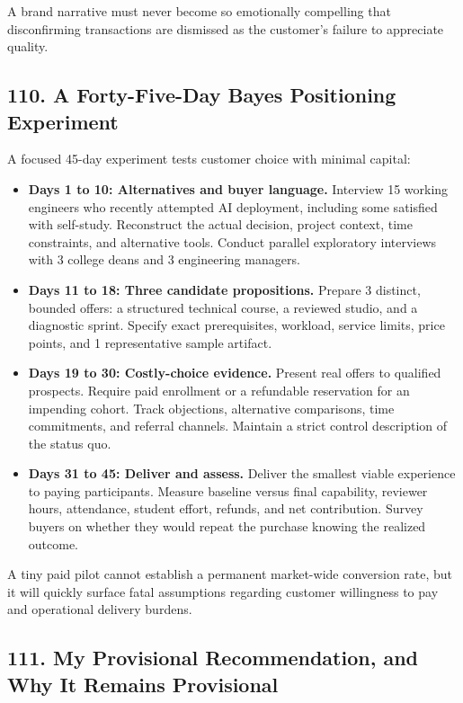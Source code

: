 A brand narrative must never become so emotionally compelling that disconfirming transactions are dismissed as the customer's failure to appreciate quality.

\subsection*{110. A Forty-Five-Day Bayes Positioning Experiment}

A focused 45-day experiment tests customer choice with minimal capital:

\begin{itemize}
    \item \textbf{Days 1 to 10: Alternatives and buyer language.} Interview 15 working engineers who recently attempted AI deployment, including some satisfied with self-study. Reconstruct the actual decision, project context, time constraints, and alternative tools. Conduct parallel exploratory interviews with 3 college deans and 3 engineering managers.
    \item \textbf{Days 11 to 18: Three candidate propositions.} Prepare 3 distinct, bounded offers: a structured technical course, a reviewed studio, and a diagnostic sprint. Specify exact prerequisites, workload, service limits, price points, and 1 representative sample artifact.
    \item \textbf{Days 19 to 30: Costly-choice evidence.} Present real offers to qualified prospects. Require paid enrollment or a refundable reservation for an impending cohort. Track objections, alternative comparisons, time commitments, and referral channels. Maintain a strict control description of the status quo.
    \item \textbf{Days 31 to 45: Deliver and assess.} Deliver the smallest viable experience to paying participants. Measure baseline versus final capability, reviewer hours, attendance, student effort, refunds, and net contribution. Survey buyers on whether they would repeat the purchase knowing the realized outcome.
\end{itemize}

A tiny paid pilot cannot establish a permanent market-wide conversion rate, but it will quickly surface fatal assumptions regarding customer willingness to pay and operational delivery burdens.

\subsection*{111. My Provisional Recommendation, and Why It Remains Provisional}

